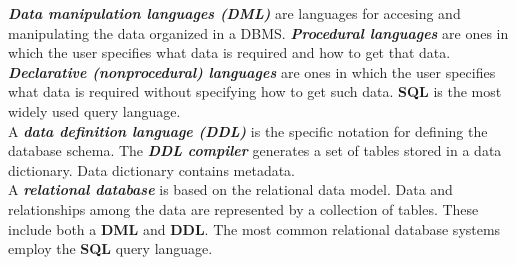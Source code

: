 \documentclass{article}
\newcommand{\bold}[1]{\textbf{#1}}
\newcommand{\define}[1]{\textbf{\textit{#1}}}
\begin{document}
\define{Data manipulation languages (DML)} are languages for accesing and manipulating the data organized in a DBMS. \define{Procedural languages} are ones in which the user specifies what data is required and how to get that data. \define{Declarative (nonprocedural) languages} are ones in which the user specifies what data is required without specifying how to get such data. \bold{SQL} is the most widely used query language. \\ 

A \define{data definition language (DDL)} is the specific notation for defining the database schema. The \define{DDL compiler} generates a set of tables stored in a data dictionary. Data dictionary contains metadata. \\ 

A \define{relational database} is based on the relational data model. Data and relationships among the data are represented by a collection of tables. These include both a \bold{DML} and \bold{DDL}. The most common relational database systems employ the \bold{SQL} query language. 
\end{document}
